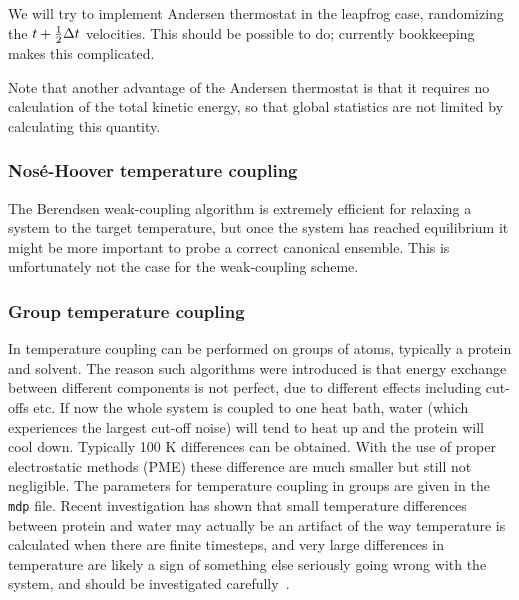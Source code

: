 \documentclass[11pt,a4paper,twoside]{article}
\begin{document}
We will try to implement Andersen thermostat in the leapfrog case,
randomizing the $t + \frac{1}{2} {\Delta t}$ velocities.  This should be possible to do;
currently bookkeeping makes this complicated. 

Note that another advantage of the Andersen thermostat is that it
requires no calculation of the total kinetic energy, so that global
statistics are not limited by calculating this quantity.

\subsubsection{Nos{\'e}-Hoover temperature coupling}

The Berendsen weak-coupling algorithm is
extremely efficient for relaxing a system to the target temperature,
but once the system has reached equilibrium it might be more
important to probe a correct canonical ensemble. This is unfortunately
not the case for the weak-coupling scheme.

\subsubsection{Group temperature coupling}%
In {\gromacs} temperature coupling can be performed on groups of
atoms, typically a protein and solvent. The reason such algorithms
were introduced is that energy exchange between different components
is not perfect, due to different effects including cut-offs etc. If
now the whole system is coupled to one heat bath, water (which
experiences the largest cut-off noise) will tend to heat up and the
protein will cool down. Typically 100 K differences can be obtained.
With the use of proper electrostatic methods (PME) these difference
are much smaller but still not negligible.  The parameters for
temperature coupling in groups are given in the {\tt mdp} file.
Recent investigation has shown that small temperature differences
between protein and water may actually be an artifact of the way
temperature is calculated when there are finite timesteps, and very
large differences in temperature are likely a sign of something else
seriously going wrong with the system, and should be investigated
carefully~\cite{Eastwood2010}.
\end{document}
